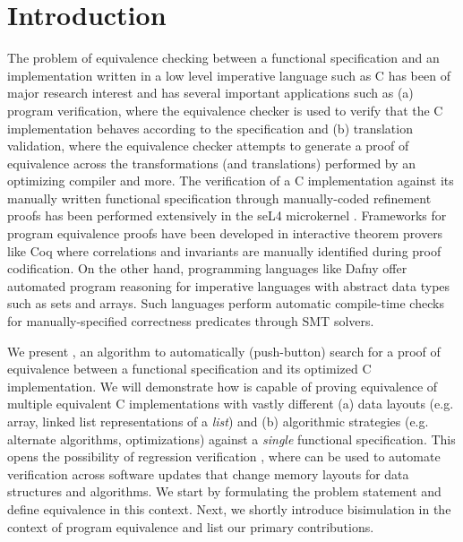 \vspace{-7px}
\section{Introduction}
\label{sec:syn-intro}
\vspace{-7px}
The problem of equivalence checking between a functional specification and an
implementation written in a low level imperative language such as C
has been of major research interest
and has several important applications such as (a) program verification, where
the equivalence checker is used to verify that the C implementation
behaves according to the specification and (b) translation validation, where
the equivalence checker attempts to generate a proof of equivalence across
the transformations (and translations) performed by an optimizing compiler
and more. The verification of a C implementation against its manually written
functional specification through manually-coded refinement proofs has been
performed extensively in the seL4 microkernel \cite{seL4}.
Frameworks for program equivalence proofs have been developed in interactive
theorem provers like Coq \cite{programEquivalenceInCoq} where correlations and invariants
are manually identified during proof codification.
On the other hand, programming languages like Dafny \cite{dafny} offer automated program
reasoning for imperative languages with abstract data types such as sets and arrays.
Such languages perform automatic compile-time checks for manually-specified correctness predicates through
SMT solvers.

We present \toolName{}, an algorithm to automatically (push-button) search
for a proof of equivalence between a functional specification and its
optimized C implementation. We will demonstrate how \toolName{} is capable of
proving equivalence of multiple equivalent C implementations with vastly
different (a) data layouts (e.g. array, linked list representations of a {\em list})
and (b) algorithmic strategies (e.g. alternate algorithms, optimizations) against
a {\em single} functional specification.
This opens the possibility of regression verification \cite{strichman_regressverify,felsing14},
where \toolName{} can be used to automate verification across software updates that change memory layouts for
data structures and algorithms.
We start by formulating the problem statement and define equivalence in this context.
Next, we shortly introduce bisimulation in the context of program equivalence and list our primary contributions.
\vspace{-7px}
